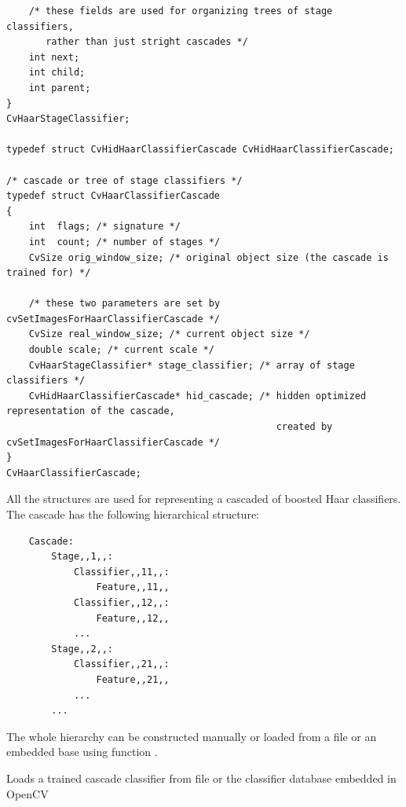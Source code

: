 \begin{lstlisting}
    /* these fields are used for organizing trees of stage classifiers,
       rather than just stright cascades */
    int next;
    int child;
    int parent;
}
CvHaarStageClassifier;

typedef struct CvHidHaarClassifierCascade CvHidHaarClassifierCascade;

/* cascade or tree of stage classifiers */
typedef struct CvHaarClassifierCascade
{
    int  flags; /* signature */
    int  count; /* number of stages */
    CvSize orig_window_size; /* original object size (the cascade is trained for) */

    /* these two parameters are set by cvSetImagesForHaarClassifierCascade */
    CvSize real_window_size; /* current object size */
    double scale; /* current scale */
    CvHaarStageClassifier* stage_classifier; /* array of stage classifiers */
    CvHidHaarClassifierCascade* hid_cascade; /* hidden optimized representation of the cascade,
                                                created by cvSetImagesForHaarClassifierCascade */
}
CvHaarClassifierCascade;
\end{lstlisting}

All the structures are used for representing a cascaded of boosted Haar classifiers. The cascade has the following hierarchical structure:

\begin{verbatim}
    Cascade:
        Stage,,1,,:
            Classifier,,11,,:
                Feature,,11,,
            Classifier,,12,,:
                Feature,,12,,
            ...
        Stage,,2,,:
            Classifier,,21,,:
                Feature,,21,,
            ...
        ...
\end{verbatim}

The whole hierarchy can be constructed manually or loaded from a file or an embedded base using function .


\label{LoadHaarClassifierCascade}

Loads a trained cascade classifier from file or the classifier database embedded in OpenCV


\begin{description}
\end{description}

